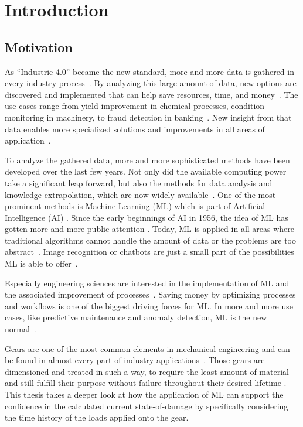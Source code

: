 \chapter{Introduction}
\section{Motivation}\label{intro}
As “Industrie 4.0” became the new standard, more and more data is gathered in every industry process~\cite{Vogel}. By analyzing this large amount of data, new options are discovered and implemented that can help save resources, time, and money~\cite{Theodoridis}. The use-cases range from yield improvement in chemical processes, condition monitoring in machinery, to fraud detection in banking~\cite{Janiesch}. New insight from that data enables more specialized solutions and improvements in all areas of application~\cite{Russell}. 

To analyze the gathered data, more and more sophisticated methods have been developed over the last few years. Not only did the available computing power take a significant leap forward, but also the methods for data analysis and knowledge extrapolation, which are now widely available~\cite{Janiesch}. One of the most prominent methods is Machine Learning (ML) which is part of Artificial Intelligence (AI) \cite{Helm}. Since the early beginnings of AI in 1956, the idea of ML has gotten more and more public attention \cite{Russell}. Today, ML is applied in all areas where traditional algorithms cannot handle the amount of data or the problems are too abstract~\cite{Carleo}. Image recognition or chatbots are just a small part of the possibilities ML is able to offer~\cite{Theodoridis}.

Especially engineering sciences are interested in the implementation of ML and the associated improvement of processes~\cite{Carleo}. Saving money by optimizing processes and workflows is one of the biggest driving forces for ML. In more and more use cases, like predictive maintenance and anomaly detection, ML is the new normal~\cite{Theodoridis}.

Gears are one of the most common elements in mechanical engineering and can be found in almost every part of industry applications~\cite{Vullo}. Those gears are dimensioned and treated in such a way, to require the least amount of material and still fulfill their purpose without failure throughout their desired lifetime \cite{Bugliarello}. This thesis takes a deeper look at how the application of ML can support the confidence in the calculated current state-of-damage by specifically considering the time history of the loads applied onto the gear.
